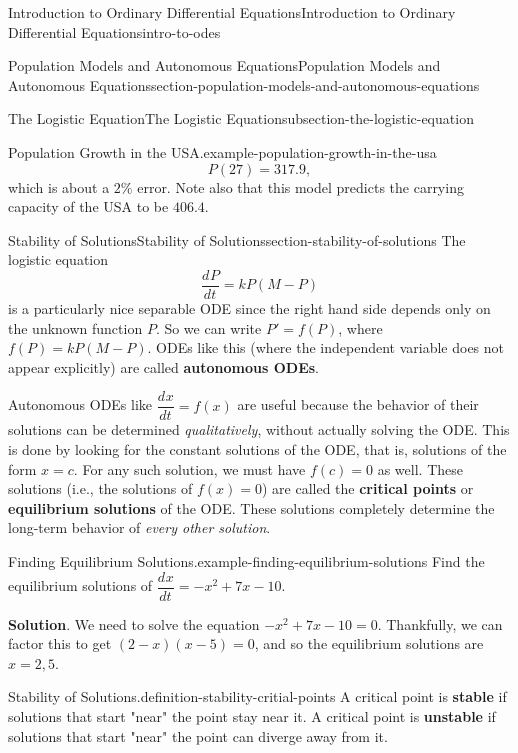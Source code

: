 \documentclass[oneside,10pt,]{book}
\newcommand{\terminology}[1]{\textbf{#1}}
\numberwithin{equation}{section}
\newcommand{\dv}[3][]{\dfrac{d^{#1} #2}{d #3^{#1}}}
\begin{document}
\begin{chapterptx}{Introduction to Ordinary Differential Equations}{}{Introduction to Ordinary Differential Equations}{}{}{intro-to-odes}
\begin{sectionptx}{Population Models and Autonomous Equations}{}{Population Models and Autonomous Equations}{}{}{section-population-models-and-autonomous-equations}
\begin{subsectionptx}{The Logistic Equation}{}{The Logistic Equation}{}{}{subsection-the-logistic-equation}
\begin{example}{Population Growth in the USA.}{example-population-growth-in-the-usa}
\begin{equation*}
P(27) = 317.9,
\end{equation*}
which is about a \(2\%\) error. Note also that this model predicts the carrying capacity of the USA to be \(406.4\).%
\end{example}
\end{subsectionptx}
%
%
\typeout{************************************************}
\typeout{************************************************}
%
\begin{subsectionptx}{Stability of Solutions}{}{Stability of Solutions}{}{}{section-stability-of-solutions}
\hypertarget{p-120}{}%
The logistic equation%
\begin{equation*}
\dv{P}{t} = kP(M-P)
\end{equation*}
is a particularly nice separable ODE since the right hand side depends only on the unknown function \(P\). So we can write \(P' = f(P)\), where \(f(P) = kP(M-P)\). ODEs like this (where the independent variable does not appear explicitly) are called \terminology{autonomous ODEs}.%
\par
\hypertarget{p-121}{}%
Autonomous ODEs like \(\dv{x}{t} = f(x)\) are useful because the behavior of their solutions can be determined \emph{qualitatively}, without actually solving the ODE. This is done by looking for the constant solutions of the ODE, that is, solutions of the form \(x = c\). For any such solution, we must have \(f(c) = 0\) as well. These solutions (i.e., the solutions of \(f(x) = 0\)) are called the \terminology{critical points} or \terminology{equilibrium solutions} of the ODE. These solutions completely determine the long-term behavior of \emph{every other solution}.%
\begin{example}{Finding Equilibrium Solutions.}{example-finding-equilibrium-solutions}%
\hypertarget{p-122}{}%
Find the equilibrium solutions of \(\dv{x}{t} = -x^{2} + 7x - 10\).%
\par\smallskip%
\noindent\textbf{Solution}.\hypertarget{solution-20}{}\quad%
\hypertarget{p-123}{}%
We need to solve the equation \(-x^{2} + 7x - 10 = 0\). Thankfully, we can factor this to get \((2-x)(x-5) = 0\), and so the equilibrium solutions are \(x = 2,5\).%
\end{example}
\begin{definition}{Stability of Solutions.}{definition-stability-critial-points}%
\hypertarget{p-124}{}%
A critical point is \terminology{stable} if solutions that start "near" the point stay near it. A critical point is \terminology{unstable} if solutions that start "near" the point can diverge away from it.%

\end{definition}
\end{subsectionptx}
\end{sectionptx}
\end{chapterptx}
\end{document}
